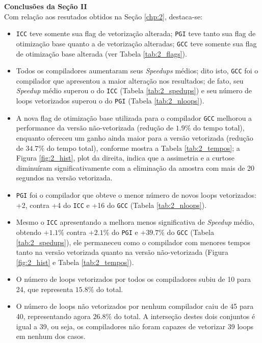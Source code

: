 \textbf{Conclusões da Seção II}\vspace{6mm}\\
Com relação aos resutados obtidos na Seção \ref{chp:2}, destaca-se:
\begin{itemize}
\item \texttt{ICC} teve somente sua flag de vetorização alterada; \texttt{PGI} teve tanto sua flag de otimização base quanto a de vetorização alteradas; \texttt{GCC} teve somente sua flag de otimização base alterada (ver Tabela \ref{tab:2_flags}).
%
\item Todos os compiladores aumentaram seus \textit{Speedups} médios; dito isto, \texttt{GCC} foi o compilador que apresentou a maior alteração nos resultados; de fato, seu \textit{Speedup} médio superou o do \texttt{ICC} (Tabela \ref{tab:2_spedups}) e seu número de loops vetorizados superou o do \texttt{PGI} (Tabela \ref{tab:2_nloops}).
%
\item A nova flag de otimização base utilizada para o compilador \texttt{GCC} melhorou a performance da versão não-vetorizada (redução de $1.9\%$ do tempo total), enquanto ofereceu um ganho ainda maior para a versão vetorizada (redução de $34.7\%$ do tempo total), conforme mostra a Tabela \ref{tab:2_tempos}; a Figura \ref{fig:2_hist}, plot da direita, indica que a assimetria e a curtose diminuíram significativamente com a eliminação da amostra com mais de 20 segundos na versão vetorizada.
%
\item \texttt{PGI} foi o compilador que obteve o menor número de novos loops vetorizados: +2, contra +4 do \texttt{ICC} e +16 do \texttt{GCC} (Tabela \ref{tab:2_nloops}).
%
\item Mesmo o \texttt{ICC} apresentando a melhora menos significativa de \textit{Speedup} médio, obtendo $+1.1\%$ contra $+2.1\%$ do \texttt{PGI} e $+39.7\%$ do \texttt{GCC} (Tabela \ref{tab:2_spedups}), ele permaneceu como o compilador com menores tempos tanto na versão vetorizada quanto na versão não-vetorizada (Figura \ref{fig:2_hist} e Tabela \ref{tab:2_tempos}). 
%
\item O número de loops vetorizados por todos os compiladores subiu de 10 para 24, que representa $15.8\%$ do total. 
%
\item O número de loops não vetorizados por nenhum compilador caiu de 45 para 40, representando agora $26.8\%$ do total. A interseção destes dois conjuntos é igual a 39, ou seja, os compiladores não foram capazes de vetorizar 39 loops em nenhum dos casos.
\end{itemize}
